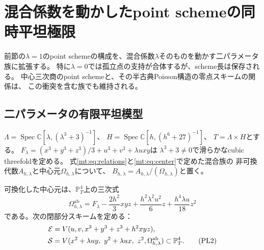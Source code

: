 \section{混合係数を動かしたpoint schemeの同時平坦極限}
\label{psl:sec:family}

前節の$\lambda=1$のpoint schemeの構成を、混合係数$\lambda$そのものを動かす二パラメータ族に拡張する。
特に$\lambda=0$では孤立点の支持が合体するが、scheme長は保存される。
中心三次商のpoint schemeと、その半古典Poisson構造の零点スキームの関係は、
この衝突を含む族でも維持される。

\subsection{二パラメータの有限平坦模型}

$\Lambda=\operatorname{Spec}\mathbb C[\lambda,(\lambda^3+3)^{-1}]$、
$H=\operatorname{Spec}\mathbb C[h,(h^6+27)^{-1}]$、
$T=\Lambda\times H$とする。
$F_\lambda=(x^3+y^3+z^3)/3+u^3+v^3+\lambda uxy$は
$\lambda^3+3\ne0$で滑らかなcubic threefoldを定める。
式\eqref{mt:eq:relations}と\eqref{mt:eq:center}で定めた混合族の
非可換代数$A_{h,\lambda}$と中心元$\Omega_{h,\lambda}$について、
$B_{h,\lambda}=A_{h,\lambda}/(\Omega_{h,\lambda})$と置く。

可換化した中心元は、$\mathbb P^4_T$上の三次式
\begin{equation}
 \Omega_{h,\lambda}^{\mathrm{ab}}
 =F_\lambda-\frac{2h^2}{3}xyz
 +\frac{h^2\lambda^2u^2}{6}z+\frac{h^4\lambda u}{18}z^2
 \tag{PL1}\label{psl:eq:abelian}
\end{equation}
である。次の閉部分スキームを定める：
\begin{align}
 \mathcal E&=V(u,v,x^3+y^3+z^3+h^2xyz),\notag\\
 \mathcal S&=V(x^2+\lambda uy,\ y^2+\lambda ux,\ z^2,
                       \Omega_{h,\lambda}^{\mathrm{ab}})
                  \subset\mathbb P^4_T.
 \tag{PL2}\label{psl:eq:families}
\end{align}

